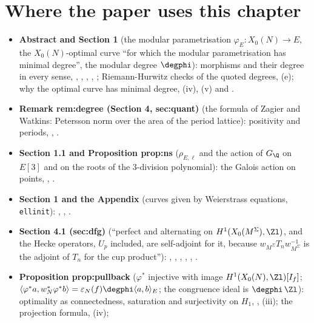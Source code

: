 \section*{Where the paper uses this chapter}

\begin{itemize}
\item \textbf{Abstract and Section 1} (the modular parametrisation $\varphi_E\colon X_0(N)\to E$, the $X_0(N)$-optimal curve ``for which the modular parametrisation has minimal degree'', the modular
degree $\degphi$): morphisms and their degree in every sense, , , , ,
; Riemann-Hurwitz checks of the quoted degrees, (e); why the optimal curve has minimal degree,
(iv), (v) and .
\item \textbf{Remark rem:degree (Section 4, sec:quant)} (the formula of Zagier and Watkins: Petersson norm over the area of the period lattice): positivity and periods, ,
.
\item \textbf{Section 1.1 and Proposition prop:ns} ($\rho_{E,\ell}$ and the action of $G_\Q$ on $E[3]$ and on the roots of the $3$-division polynomial): the Galois action on points,
, .
\item \textbf{Section 1 and the Appendix} (curves given by Weierstrass equations, \texttt{ellinit}): , ,
.
\item \textbf{Section 4.1 (sec:dfg)} (``perfect and alternating on $H^1(X_0(M^\Sigma),\Zl)$, and the Hecke operators, $U_p$ included, are self-adjoint for it, because $w_{M^\Sigma}T_nw_{M^\Sigma}^{-1}$ is the adjoint of
$T_n$ for the cup product''): , , , ,
, .
\item \textbf{Proposition prop:pullback} ($\varphi^*$ injective with image $H^1(X_0(N),\Zl)[I_f]$; $\langle\varphi^*a,w_N^*\varphi^*b\rangle=\varepsilon_N(f)\degphi\langle a,b\rangle_E$; the congruence ideal is $\degphi\,\Zl$):
optimality as connectedness, saturation and surjectivity on $H_1$, , (iii); the projection formula, (iv);

\end{itemize}
